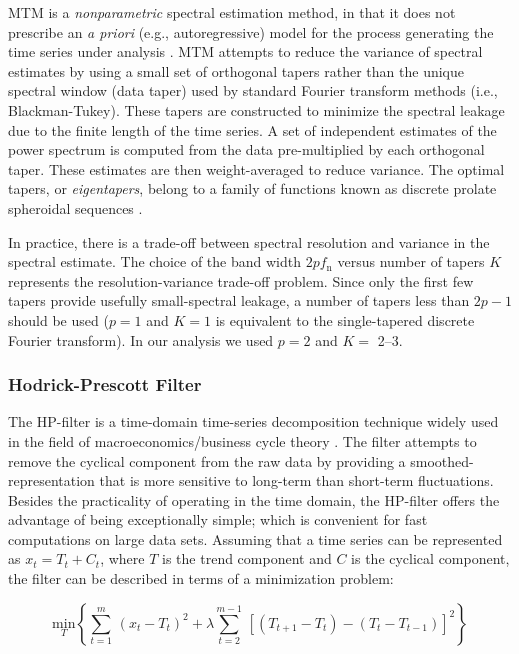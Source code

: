 \noindent
MTM is a \emph{nonparametric} spectral estimation method, in that it does not prescribe an {\it a priori} (e.g., autoregressive) model for the process generating the time series under analysis \parencite{Thomson1982, Percival1993}. MTM attempts to reduce the variance of spectral estimates by using a small set of orthogonal tapers rather than the unique spectral window (data taper) used by standard Fourier transform methods (i.e., Blackman-Tukey). These tapers are constructed to minimize the spectral leakage due to the finite length of the time series. A set of independent estimates of the power spectrum is computed from the data pre-multiplied by each orthogonal taper. These estimates are then weight-averaged to reduce variance. The optimal tapers, or \emph{eigentapers}, belong to a family of functions known as discrete prolate spheroidal sequences \parencite[see][]{Percival1993}.

In practice, there is a trade-off between spectral resolution and variance in the spectral estimate. The choice of the band width $2 p f_\text{n}$ versus number of tapers $K$ represents the resolution-variance trade-off problem. Since only the first few tapers provide usefully small-spectral leakage, a number of tapers less than $2p - 1$ should be used ($p=1$ and $K=1$ is equivalent to the single-tapered discrete Fourier transform). In our analysis we used $p=2$ and $K=$ 2--3.

\subsubsection*{Hodrick-Prescott Filter}

\noindent
The HP-filter is a time-domain time-series decomposition technique widely used in the field of macroeconomics/business cycle theory \parencite{Hodrick1997}. The filter attempts to remove the cyclical component from the raw data by providing a smoothed-representation that is more sensitive to long-term than short-term fluctuations. Besides the practicality of operating in the time domain, the HP-filter offers the advantage of being exceptionally simple; which is convenient for fast computations on large data sets. Assuming that a time series can be represented as $x_t = T_t + C_t$, where $T$ is the trend component and $C$ is the cyclical component, the filter can be described in terms of a minimization problem:

\begin{equation}
  \underset{T}{\text{min}} \left\{
    \sum_{t=1}^m \, (x_t - T_t)^2 +
    \lambda \sum_{t=2}^{m-1} \, [(T_{t+1} - T_t) - (T_t - T_{t-1})]^2
  \right\}
  \label{hp-filter}
\end{equation}

